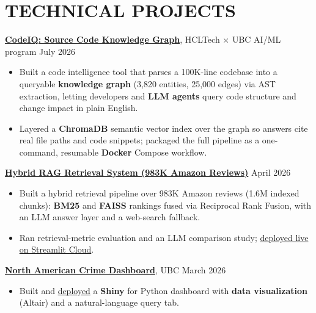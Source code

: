 \documentclass[10pt,a4paper]{article}
\begin{document}
\section*{TECHNICAL PROJECTS}

\textbf{\href{https://github.com/goudmani/codeiq_source_code_knowledge_graph}{CodeIQ: Source Code Knowledge Graph}}, HCLTech $\times$ UBC AI/ML program \hfill \small{July 2026}
\begin{itemize}[leftmargin=*, itemsep=1pt, topsep=1pt]
    \item Built a code intelligence tool that parses a 100K-line codebase into a queryable
    \textbf{knowledge graph} (3,820 entities, 25,000 edges) via AST extraction, letting
    developers and \textbf{LLM agents} query code structure and change impact in plain English.
    \item Layered a \textbf{ChromaDB} semantic vector index over the graph so answers cite real
    file paths and code snippets; packaged the full pipeline as a one-command, resumable
    \textbf{Docker} Compose workflow.
\end{itemize}

\vspace{1pt}

\textbf{\href{https://github.com/goudmani/Amazon_movie_recommendation_using_RAG}{Hybrid RAG Retrieval System (983K Amazon Reviews)}} \hfill \small{April 2026}
\begin{itemize}[leftmargin=*, itemsep=1pt, topsep=1pt]
    \item Built a hybrid retrieval pipeline over 983K Amazon reviews (1.6M indexed chunks):
    \textbf{BM25} and \textbf{FAISS} rankings fused via Reciprocal Rank Fusion, with an LLM
    answer layer and a web-search fallback.
    \item Ran retrieval-metric evaluation and an LLM comparison study;
    \href{https://informationbm25semantic.streamlit.app/}{deployed live on Streamlit Cloud}.
\end{itemize}

\vspace{1pt}

\textbf{\href{https://github.com/goudmani/US_crime_dashboard}{North American Crime Dashboard}}, UBC \hfill \small{March 2026}
\begin{itemize}[leftmargin=*, itemsep=1pt, topsep=1pt]
    \item Built and \href{https://019c9723-a4d1-3cd7-eb5c-fa163f62eb99.share.connect.posit.cloud/}{deployed}
    a \textbf{Shiny} for Python dashboard with \textbf{data visualization} (Altair) and a
    natural-language query tab.
\end{itemize}
\end{document}
